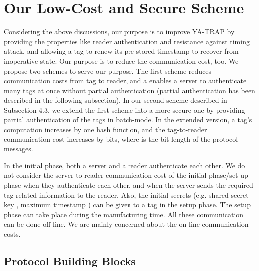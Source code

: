 \documentclass{easychair}
\begin{document}
\section{Our Low-Cost and Secure Scheme}\label{sec:item}

Considering the above discussions, our purpose is to improve YA-TRAP by providing the properties like reader authentication and resistance against timing attack, and allowing a tag to renew its pre-stored timestamp to recover from inoperative state. Our purpose is to reduce the communication cost, too. We propose two schemes to serve our purpose. The first scheme reduces communication costs from tag to reader, and a enables a server to authenticate many tags at once without partial authentication (partial authentication has been described in the following subsection). 
In our second scheme described in Subsection 4.3, we extend the first scheme into a more secure one by providing partial authentication of the tags in batch-mode. In the extended version, 
a tag's computation increases by one hash function, and the tag-to-reader 
communication cost increases by  bits, where  is the bit-length of the protocol messages. 

In the initial phase, both a server and a reader authenticate each other. We do not consider the server-to-reader
communication cost of the initial phase/set up phase when they authenticate each other, and when the server sends the required tag-related information to the reader. Also, the initial secrets (e.g. shared secret key , maximum timestamp ) can be given to a tag in the setup phase. The setup phase can take place during the manufacturing time. All these communication can be done off-line. We are mainly concerned about the on-line
communication costs. 


\subsection{Protocol Building Blocks}
\end{document}
